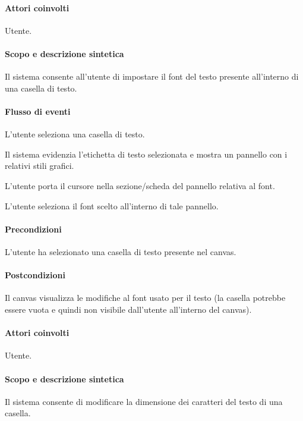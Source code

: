 \paragraph{Attori coinvolti} Utente.
\paragraph{Scopo e descrizione sintetica} 
Il sistema consente all'utente di impostare il font del testo presente all'interno di una casella di testo.
\paragraph{Flusso di eventi}
\begin{elenconumerato}[\textbf{}]{\subsubsecindent}
\item L'utente seleziona una casella di testo.
\item Il sistema evidenzia l'etichetta di testo selezionata e mostra un pannello con i relativi stili grafici.
\item L'utente porta il cursore nella sezione/scheda del pannello relativa al font.
\item L'utente seleziona il font scelto all'interno di tale pannello.
\end{elenconumerato}
\paragraph{Precondizioni} L'utente ha selezionato una casella di testo presente nel canvas.
\paragraph{Postcondizioni} Il canvas visualizza le modifiche al font usato per il testo (la casella potrebbe essere vuota e quindi non visibile dall'utente all'interno del canvas).

\paragraph{Attori coinvolti} Utente.
\paragraph{Scopo e descrizione sintetica} 
Il sistema consente di modificare la dimensione dei caratteri del testo di una casella.
